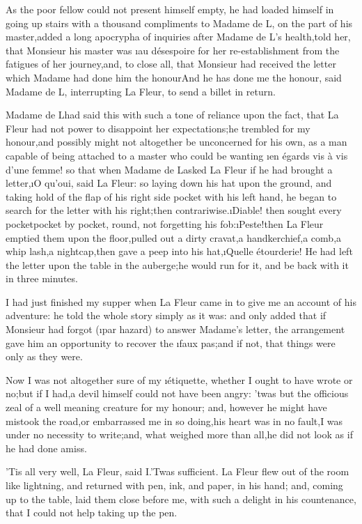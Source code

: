 \documentclass[twoside]{article}
\begin{document}
As the poor fellow could not present himself empty, he had loaded himself
in going up stairs with a thousand compliments to Madame de L\tsk , on the
part of his master,\tsk added a long apocrypha of inquiries after Madame de
L\tsk ’s health,\tsk told her, that Monsieur his master was \i{au désespoire} for
her re-establishment from the fatigues of her journey,\tsk and, to close all,
that Monsieur had received the letter which Madame had done him the
honour\tsk And he has done me the honour, said Madame de L\tsk , interrupting La
Fleur, to send a billet in return.

Madame de L\tsk  had said this with such a tone of reliance upon the fact,
that La Fleur had not power to disappoint her expectations;\tsk he trembled
for my honour,\tsk and possibly might not altogether be unconcerned for his
own, as a man capable of being attached to a master who could be wanting
\i{en égards vis à vis d’une femme}! so that when Madame de L\tsk  asked La
Fleur if he had brought a letter,\tsk \i{O qu’oui}, said La Fleur: so laying
down his hat upon the ground, and taking hold of the flap of his right
side pocket with his left hand, he began to search for the letter with
his right;\tsk then contrariwise.\tsk \i{Diable}! then sought every pocket\tsk pocket
by pocket, round, not forgetting his fob:\tsk \i{Peste}!\tsk then La Fleur emptied
them upon the floor,\tsk pulled out a dirty cravat,\tsk a handkerchief,\tsk a comb,\tsk a
whip lash,\tsk a nightcap,\tsk then gave a peep into his hat,\tsk \i{Quelle
étourderie}!  He had left the letter upon the table in the auberge;\tsk he
would run for it, and be back with it in three minutes.

I had just finished my supper when La Fleur came in to give me an account
of his adventure: he told the whole story simply as it was: and only
added that if Monsieur had forgot (\i{par hazard}) to answer Madame’s
letter, the arrangement gave him an opportunity to recover the \i{faux
pas};\tsk and if not, that things were only as they were.

Now I was not altogether sure of my \i{étiquette}, whether I ought to have
wrote or no;\tsk but if I had,\tsk a devil himself could not have been angry:
’twas but the officious zeal of a well meaning creature for my honour;
and, however he might have mistook the road,\tsk or embarrassed me in so
doing,\tsk his heart was in no fault,\tsk I was under no necessity to write;\tsk and,
what weighed more than all,\tsk he did not look as if he had done amiss.

\tsk ’Tis all very well, La Fleur, said I.\tsk ’Twas sufficient.  La Fleur flew
out of the room like lightning, and returned with pen, ink, and paper, in
his hand; and, coming up to the table, laid them close before me, with
such a delight in his countenance, that I could not help taking up the
pen.
\end{document}
